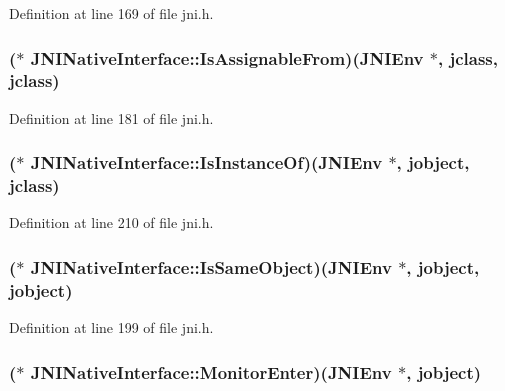 Definition at line 169 of file jni.\-h.

\hypertarget{struct_j_n_i_native_interface_a9e7e42fe9e4ba220363848c561f6cf77}{
\subsubsection[{Is\-Assignable\-From}]{($\ast$ J\-N\-I\-Native\-Interface\-::\-Is\-Assignable\-From)({\bf J\-N\-I\-Env} $\ast$, {\bf jclass}, {\bf jclass})}}\label{struct_j_n_i_native_interface_a9e7e42fe9e4ba220363848c561f6cf77}


Definition at line 181 of file jni.\-h.

\hypertarget{struct_j_n_i_native_interface_a0eb07283c6374c3288b5c433f0f0c30e}{
\subsubsection[{Is\-Instance\-Of}]{($\ast$ J\-N\-I\-Native\-Interface\-::\-Is\-Instance\-Of)({\bf J\-N\-I\-Env} $\ast$, {\bf jobject}, {\bf jclass})}}\label{struct_j_n_i_native_interface_a0eb07283c6374c3288b5c433f0f0c30e}


Definition at line 210 of file jni.\-h.

\hypertarget{struct_j_n_i_native_interface_ab18ceaa5c55685f7785a459de18e5677}{
\subsubsection[{Is\-Same\-Object}]{($\ast$ J\-N\-I\-Native\-Interface\-::\-Is\-Same\-Object)({\bf J\-N\-I\-Env} $\ast$, {\bf jobject}, {\bf jobject})}}\label{struct_j_n_i_native_interface_ab18ceaa5c55685f7785a459de18e5677}


Definition at line 199 of file jni.\-h.

\hypertarget{struct_j_n_i_native_interface_a772a0e07a8f160bc239efc38d9603c31}{
\subsubsection[{Monitor\-Enter}]{($\ast$ J\-N\-I\-Native\-Interface\-::\-Monitor\-Enter)({\bf J\-N\-I\-Env} $\ast$, {\bf jobject})}}\label{struct_j_n_i_native_interface_a772a0e07a8f160bc239efc38d9603c31}



